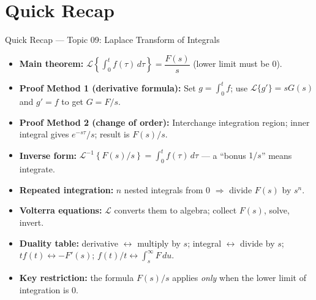 \documentclass[12pt,a4paper]{article}
\begin{document}
\section{Quick Recap}

\begin{learnbox}{Quick Recap --- Topic 09: Laplace Transform of Integrals}
\begin{itemize}[itemsep=4pt]
  \item \textbf{Main theorem:}
    $\mathcal{L}\!\left\{\int_0^t f(\tau)\,d\tau\right\} = \dfrac{F(s)}{s}$
    (lower limit must be $0$).
  \item \textbf{Proof Method 1 (derivative formula):} Set $g = \int_0^t f$;
    use $\mathcal{L}\{g'\} = sG(s)$ and $g'= f$ to get $G = F/s$.
  \item \textbf{Proof Method 2 (change of order):} Interchange integration region;
    inner integral gives $e^{-s\tau}/s$; result is $F(s)/s$.
  \item \textbf{Inverse form:}
    $\mathcal{L}^{-1}\!\left\{F(s)/s\right\} = \int_0^t f(\tau)\,d\tau$
    --- a ``bonus $1/s$'' means integrate.
  \item \textbf{Repeated integration:}
    $n$ nested integrals from $0$ $\Rightarrow$ divide $F(s)$ by $s^n$.
  \item \textbf{Volterra equations:} $\mathcal{L}$ converts them to algebra;
    collect $F(s)$, solve, invert.
  \item \textbf{Duality table:} derivative $\leftrightarrow$ multiply by $s$;
    integral $\leftrightarrow$ divide by $s$; $tf(t) \leftrightarrow -F'(s)$;
    $f(t)/t \leftrightarrow \int_s^\infty F\,du$.
  \item \textbf{Key restriction:} the formula $F(s)/s$ applies \emph{only} when the
    lower limit of integration is $0$.
\end{itemize}
\end{learnbox}
\end{document}
